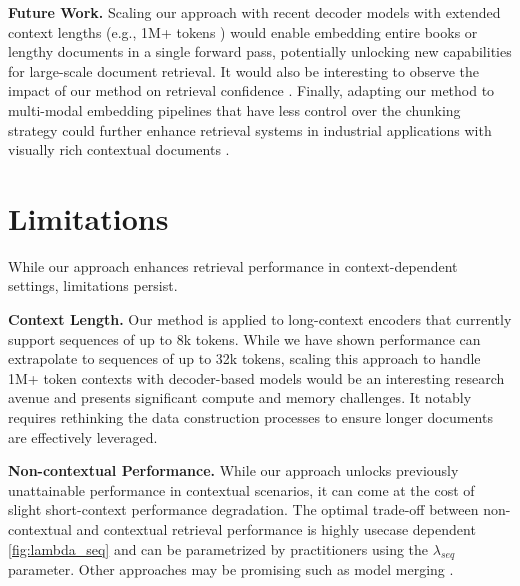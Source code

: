 \noindent\textbf{Future Work.} Scaling our approach with recent decoder models with extended context lengths (e.g., 1M+ tokens ) would enable embedding entire books or lengthy documents in a single forward pass, potentially unlocking new capabilities for large-scale document retrieval. It would also be interesting to observe the impact of our method on retrieval confidence . Finally, adapting our method to multi-modal embedding pipelines that have less control over the chunking strategy could further enhance retrieval systems in industrial applications with visually rich contextual documents . 




\section*{Limitations}

While our approach enhances retrieval performance in context-dependent settings, limitations persist.

\noindent\textbf{Context Length.} Our method is applied to long-context encoders that currently support sequences of up to 8k tokens. While we have shown performance can extrapolate to sequences of up to 32k tokens, scaling this approach to handle 1M+ token contexts with decoder-based models would be an interesting research avenue and presents significant compute and memory challenges. It notably requires rethinking the data construction processes to ensure longer documents are effectively leveraged.

\noindent\textbf{Non-contextual Performance.}
While our approach unlocks previously unattainable performance in contextual scenarios, it can come at the cost of slight short-context performance degradation. The optimal trade-off between non-contextual and contextual retrieval performance is highly usecase dependent \autoref{fig:lambda_seq} and can be parametrized by practitioners using the $\lambda_{seq}$ parameter. Other approaches may be promising such as model merging .


